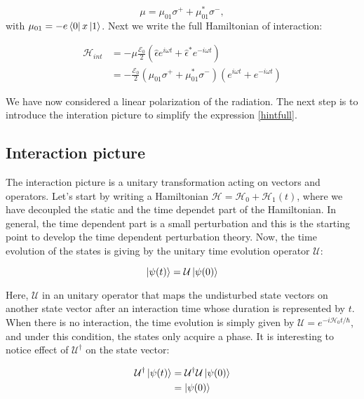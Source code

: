 \documentclass[letterpaper, 12pt]{article}
\begin{document}
\begin{equation}
    \mu = \mu _{01} \sigma^{+} + \mu _{01}^{*} \sigma^{-},
\end{equation}
with $\mu _{01} = - e \bra{0}x\ket{1}$. 
Next we write the full Hamiltonian of interaction:


\begin{equation} \label{hintfull}
\begin{split}
    \mathcal{H} _{int} & = - \mu \frac{\mathcal{E}_{0}}{2}  ( \hat{\epsilon}e^{i \omega t} + \hat{\epsilon}^{*}e^{ - i \omega t}) \\
                       & = - \frac{\mathcal{E}_{0}}{2} (\mu _{01} \sigma^{+} + \mu _{01}^{*} \sigma^{-}) ( e^{i \omega t} + e^{ - i \omega t})
\end{split}
\end{equation}

We have now considered a linear polarization of the radiation. The next step is to introduce the interation picture to simplify the expression \ref{hintfull}.

\subsection{Interaction picture}

The interaction picture is a unitary transformation acting on vectors and operators. Let's start by writing a Hamiltonian $\mathcal{H} = \mathcal{H}_{0} + \mathcal{H}_{1}(t)$, where we have decoupled the static and the time dependet part of the Hamiltonian. In general, the time dependent part is a small perturbation and this is the starting point to develop the time dependent perturbation theory. Now, the time evolution of the states is giving by the unitary time evolution operator $\mathcal{U}$:

\begin{equation}
    \ket{\psi(t)} = \mathcal{U} \ket{\psi(0)}
\end{equation}

Here, $\mathcal{U}$ in an unitary operator that maps the undisturbed state vectors on another state vector after an interaction time whose duration is represented by $t$.
When there is no interaction, the time evolution is simply given by $\mathcal{U} = e^{- i \mathcal{H}_{0} t / \hbar}$, and under this condition, the states only acquire a phase.
It is interesting to notice effect of $\mathcal{U}^{\dagger}$ on the state vector:

\begin{equation}
    \begin{split}
        \mathcal{U}^{\dagger} \ket{\psi (t)} & = \mathcal{U}^{\dagger} \mathcal{U} \ket{\psi (0)} \\
                        & = \ket{\psi (0)}
    \end{split}
\end{equation}
\end{document}
